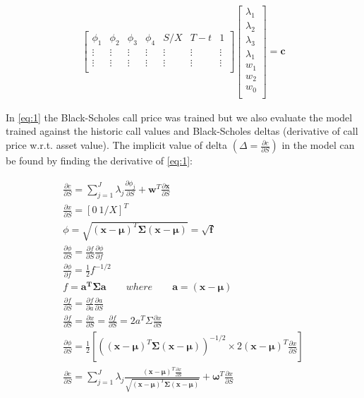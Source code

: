 \documentclass{sig-alternate-05-2015}
\begin{document}
\begin{align}
\begin{bmatrix}
  \phi_1 & \phi_2 & \phi_3 & \phi_4 & S/X & T-t & 1 \\ 
  \vdots & \vdots & \vdots & \vdots & \vdots & \vdots & \vdots \\ 
  \vdots & \vdots & \vdots & \vdots & \vdots & \vdots & \vdots \\ 
\end{bmatrix}
\begin{bmatrix}
  \lambda_1 \\ 
  \lambda_2 \\ 
  \lambda_3 \\ 
  \lambda_1 \\ 
  w_1 \\ 
  w_2 \\ 
  w_0 \\ 
  \end{bmatrix} = \mathbf{c}
\end{align}

In \eqref{eq:1} the Black-Scholes call price was trained but we also evaluate the model trained against the historic call values and Black-Scholes deltas (derivative of call price w.r.t. asset value). The implicit value of delta $\left(\Delta = \frac{\partial c}{\partial S}\right)$ in the model can be found by finding the derivative of \eqref{eq:1}:

\begin{align*}
\frac{\partial c}{\partial S} = \sum^J_{j=1} \lambda_j \frac{\partial \phi_j}{\partial S} + \mathbf{w}^T \frac{\partial \mathbf{x}}{\partial S} \\
\frac{\partial x}{\partial S} = [0 \ 1/X]^T \\
\phi = \sqrt{\mathbf{(x-\mu)}^T\mathbf{\Sigma(x-\mu)}} = \sqrt{\mathbf{f}} \\
\frac{\partial \phi}{\partial S} = \frac{\partial f}{\partial S} \frac{\partial \phi}{\partial f} \\
\frac{\partial \phi}{\partial f} = \frac{1}{2} f^{-1/2} \\
f = \mathbf{a^T\Sigma a} \qquad where \qquad \mathbf{a = (x - \mu)} \\
\frac{\partial f}{\partial S} = \frac{\partial f}{\partial a} \frac{\partial a}{\partial S} \\
\frac{\partial f}{\partial S} = \frac{\partial x}{\partial S} =
\frac{\partial f}{\partial S} = 2a^T\Sigma \frac{\partial x}{\partial S} \\
\frac{\partial \phi}{\partial S} = \frac{1}{2}\left[\left(\mathbf{(x-\mu)}^T\mathbf{\Sigma(x-\mu)}\right)^{-1/2} \times 2\mathbf{(x-\mu)}^T\frac{\partial x}{\partial S}\right] \\
\frac{\partial c}{\partial S} = \sum^J_{j=1}\lambda_j \frac{\mathbf{(x-\mu)}^T\frac{\partial x}{\partial S}}{\sqrt{\mathbf{(x-\mu)}^T\mathbf{\Sigma(x-\mu)}}}  + \mathbf{\omega}^T\frac{\partial x}{\partial S} \\
\label{eq:2}
\end{align*}
 
\end{document}
